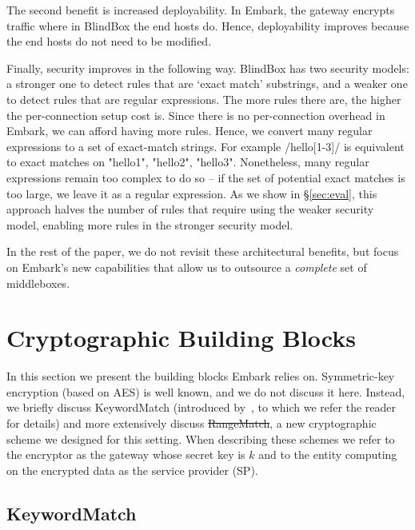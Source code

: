 \documentclass[letterpaper,twocolumn,10pt]{article}
\newcommand{\sys}{Embark\xspace} %
\providecommand{\DIFaddtex}[1]{{\protect\color{blue}\uwave{#1}}} %
\providecommand{\DIFdeltex}[1]{{\protect\color{red}\sout{#1}}}                      %
\providecommand{\DIFaddbegin}{} %
\providecommand{\DIFaddend}{} %
\providecommand{\DIFdelbegin}{} %
\providecommand{\DIFdelend}{} %
\providecommand{\DIFadd}[1]{\texorpdfstring{\DIFaddtex{#1}}{#1}} %
\providecommand{\DIFdel}[1]{\texorpdfstring{\DIFdeltex{#1}}{}} %
\begin{document}
The second benefit is increased deployability. In \sys, the gateway encrypts traffic where in BlindBox the end hosts do. Hence, deployability improves because the end hosts do not need to be modified.

Finally, security improves in the following way.
BlindBox has two security models: a stronger one to detect rules that are `exact match' substrings, and a weaker one to detect rules that are regular expressions. The more rules there are, the higher the per-connection setup cost is. 
Since there is no per-connection overhead  in \sys, we can afford having more rules. 
Hence, we convert many regular expressions to a set of exact-match strings. 
For example /hello[1-3]/ is equivalent to exact matches on "hello1", "hello2", "hello3".
Nonetheless, many regular expressions remain too complex to do so -- if the set of potential exact matches is too large, we leave it as a regular expression.
As we show in \S\ref{sec:eval}, this approach halves the number of rules that require using the weaker security model, enabling more rules in the stronger security model. 

In the rest of the paper, we do not revisit these architectural benefits, but focus  on \sys's new capabilities that allow us to outsource a {\it complete} set of middleboxes.




\section{Cryptographic Building Blocks}
\label{sec:buildingblocks}

In this section we present the building blocks \sys relies on.
Symmetric-key encryption (based on AES) is well known, and we do not discuss it here. Instead, we briefly discuss KeywordMatch (introduced by~\cite{blindbox}, to which we refer the reader for details) and more extensively discuss \DIFdelbegin \DIFdel{RangeMatch}\DIFdelend \DIFaddbegin \DIFadd{PrefixMatch}\DIFaddend , a new cryptographic scheme we designed for this setting.
When describing these schemes we refer to the encryptor as the gateway whose secret key is $k$ and to the entity computing on the encrypted data as the service provider (SP).


\subsection{KeywordMatch}\label{s:kwmatch}
\end{document}
